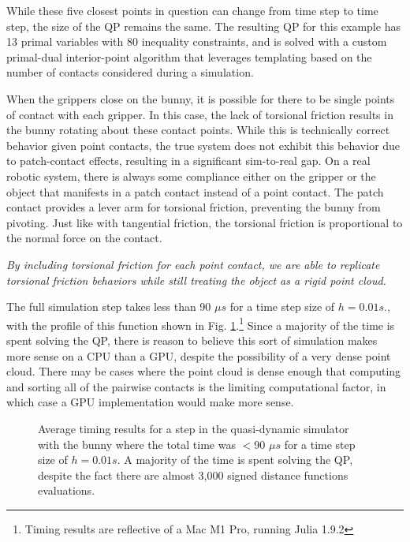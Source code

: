 While these five closest points in question can change from time step to time step, the size of the QP remains the same. 
The resulting QP for this example has 13 primal variables with 80 inequality constraints, and is solved with a custom primal-dual interior-point algorithm \cite{mehrotra1992, nocedal2006, vandenberghe} that leverages templating based on the number of contacts considered during a simulation. 

When the grippers close on the bunny, it is possible for there to be single points of contact with each gripper. In this case, the lack of torsional friction results in the bunny rotating about these contact points. While this is technically correct behavior given point contacts, the true system does not exhibit this behavior due to patch-contact effects, resulting in a significant sim-to-real gap. On a real robotic system, there is always some compliance either on the gripper or the object that manifests in a patch contact instead of a point contact. The patch contact provides a lever arm for torsional friction, preventing the bunny from pivoting.  Just like with tangential friction, the torsional friction is proportional to the normal force on the contact.

\emph{By including torsional friction for each point contact, we are able to replicate torsional friction behaviors while still treating the object as a rigid point cloud.}


The full simulation step takes less than 90 $\mu s$ for a time step size of $h = 0.01 s$., with the profile of this function shown in Fig. \ref{fig:speeds}.\footnote{Timing results are reflective of a Mac M1 Pro, running Julia 1.9.2} Since a majority of the time is spent solving the QP, there is reason to believe this sort of simulation makes more sense on a CPU than a GPU, despite the possibility of a very dense point cloud. There may be cases where the point cloud is dense enough that computing and sorting all of the pairwise contacts is the limiting computational factor, in which case a GPU implementation would make more sense. 
\begin{figure}
\centering 
{}  
\caption{Average timing results for a step in the quasi-dynamic simulator with the bunny where the total time was $<$90 $\mu s$  for a time step size of $h = 0.01s$. A majority of the time is spent solving the QP, despite the fact there are almost 3,000 signed distance functions evaluations. %
}
\label{fig:speeds}
\end{figure}

